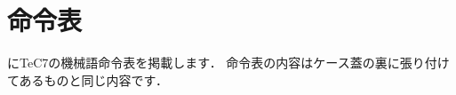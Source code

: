 \renewcommand{\myincludegraphics}[2]{\texttt{[image: appC/\#1]}}

\newpage
\onecolumn
\chapter{命令表}
\label{appC}

にTeC7の機械語命令表を掲載します．
命令表の内容はケース蓋の裏に張り付けてあるものと同じ内容です．

